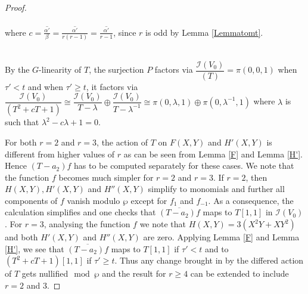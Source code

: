 \documentclass[11pt, reqno]{amsart}
\numberwithin{equation}{section}
\theoremstyle{definition}
\theoremstyle{remark}
\theoremstyle{definition}
\theoremstyle{remark}
\theoremstyle{remark}
\begin{document}
\begin{proof}
\begin{enumerate}
\begin{eqnarray*}
\end{eqnarray*}
where $c = \overline{\frac{\alpha'}{\beta}}=\overline{\frac{\alpha'}{r(r-1)}} = \overline{\frac{\alpha'}{r-1}}$, since $r$ is odd by Lemma \ref{Lemmatomt}.
\end{enumerate} 
\hspace{20mm}
\\
By the $G$-linearity of $T$,  the surjection $P$ factors via $\dfrac{\mathcal{I}(V_{0})}{(T)}= \pi(0,0,1)$ when $\tau'<t$ and when  $\tau' \geq t$, it factors via  $\dfrac{\mathcal{I}(V_{0})}{\left(T^2+ cT + 1 \right)} \cong \dfrac{\mathcal{I}(V_{0})}{T-\lambda} \oplus \dfrac{\mathcal{I}(V_{0})}{T-\lambda^{-1}} \cong \pi(0,\lambda,1) \oplus \pi(0,\lambda^{-1},1)$ where $\lambda$ is such that $\lambda^{2}-c\lambda +1=0$.

For both $r=2$ and $r=3$, the action of $T$ on $F(X,Y)$ and $H'(X,Y)$ is  different from higher values of $r$ as can be seen from Lemma \ref{F} and Lemma \ref{H'}. Hence $\left(T-a_{2}\right)f$ has to be computed separately for these cases. We note that the function $f$ becomes much simpler for $r=2$ and $r=3$. If $r=2$, then $H(X,Y), H'(X,Y)$ and $H''(X,Y)$ simplify to monomials and further all components of $f$ vanish modulo $\wp$ except for $f_{1}$ and $f_{-1}$. As a consequence, the calculation simplifies and one checks that $\overline{(T-a_{2})f}$ maps to $T[1,1]$ in $\mathcal{I}(V_{0})$. For $r=3$, analysing the function $f$ we note that $H(X,Y)= 3(X^2Y+XY^2)$ and both $H'(X,Y)$ and $H''(X,Y)$ are zero. Applying Lemma \ref{F} and Lemma \ref{H'}, we see that $\overline{(T-a_{2})f}$ maps to $T[1,1]$ if $\tau'<t$ and to $\left(T^2+cT+1\right)[1,1]$ if $\tau'\geq t$. Thus any change brought in by the differed action of $T$ gets nullified$\mod \wp$ and the result for $r\geq4$ can be extended to include $r=2$ and $3$.
\end{proof}
\end{document}
